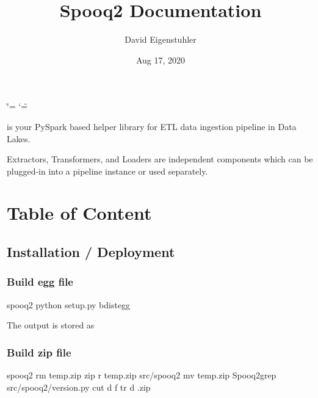 \documentclass[a4paper,10pt, twoside,english]{sphinxmanual}
\title{Spooq2 Documentation}
\date{Aug 17, 2020}
\author{David Eigenstuhler}
\begin{document}
\ifdefined\shorthandoff
  \ifnum\catcode`\=\string=\active\shorthandoff{=}\fi
  \ifnum\catcode`\"=\active{}\fi
\fi

\pagestyle{empty}
\sphinxmaketitle
\pagestyle{plain}
\sphinxtableofcontents
\pagestyle{normal}
\label{\detokenize{index::doc}}


 is your PySpark based helper library for ETL data ingestion pipeline in Data Lakes.

Extractors, Transformers, and Loaders are independent components which can be plugged-in into a pipeline instance or used separately.


\chapter{Table of Content}
\label{\detokenize{index:table-of-content}}

\section{Installation / Deployment}
\label{\detokenize{installation:installation-deployment}}\label{\detokenize{installation::doc}}

\subsection{Build egg file}
\label{\detokenize{installation:build-egg-file}}
\begin{sphinxVerbatim}[commandchars=\\\{\}]
\PYGZdl{}  spooq2
\PYGZdl{} python setup.py bdist\PYGZus{}egg
\end{sphinxVerbatim}

The output is stored as 


\subsection{Build zip file}
\label{\detokenize{installation:build-zip-file}}
\begin{sphinxVerbatim}[commandchars=\\\{\}]
\PYGZdl{}  spooq2
\PYGZdl{} rm temp.zip
\PYGZdl{} zip \PYGZhy{}r temp.zip src/spooq2
\PYGZdl{} mv temp.zip Spooq2\PYGZus{}grep  src/spooq2/\PYGZus{}version.py  
    cut \PYGZhy{}d  \PYGZhy{}f   tr \PYGZhy{}d .zip
\end{sphinxVerbatim}
\end{document}
